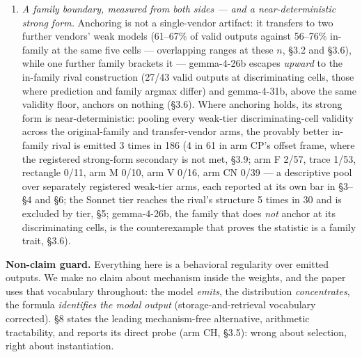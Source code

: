 \begin{enumerate}
{requests as interventions.} Method lines are checkable against emitted coordinates, and 54 of
56 scoreable claims (96.4\%) describe the object actually built (Wilson 95\% interval $[88\%, 99\%]$,
\S6.5). Requesting the line at all is an intervention rather than an observation: the
concentration shift it produced (87\% vs 70\%, $p = 0.0325$ uncorrected) fails multiplicity
correction, is carried by one of three cells and is wave-confounded (\S6.4), so it is reported
as met-as-registered exploratory material, not a demonstrated effect. Studies collecting
process descriptors \emph{by request} are nonetheless measuring a perturbed distribution.
\item \emph{A family boundary, measured from both sides --- and a near-deterministic strong form.}
Anchoring is not a single-vendor artifact: it transfers to two further vendors'
weak models (61--67\% of valid outputs against 56--76\% in-family at the same five cells --- overlapping ranges at these $n$, \S3.2 and \S3.6), while one further family brackets it ---
gemma-4-26b escapes \emph{upward} to the in-family rival construction (27/43 valid outputs at discriminating cells, those where prediction and family argmax differ) and gemma-4-31b, above the same validity floor, anchors on nothing (\S3.6). Where
anchoring holds, its strong form is near-deterministic: pooling every weak-tier discriminating-cell
validity across the original-family and transfer-vendor arms, the provably better in-family
rival is emitted 3 times in 186 (4 in 61 in arm CP's offset frame, where the registered strong-form secondary is not met, \S3.9; arm F 2/57, trace 1/53, rectangle 0/11, arm M 0/10, arm V
0/16, arm CN 0/39 --- a descriptive pool over separately registered weak-tier arms, each reported at its own bar in
\S3--\S4 and \S6; the Sonnet tier reaches the rival's structure 5 times in 30 and is excluded by tier, \S5; gemma-4-26b, the family that does \emph{not} anchor at its discriminating cells, is the
counterexample that proves the statistic is a family trait, \S3.6).
\end{enumerate}

\textbf{Non-claim guard.} Everything here is a behavioral regularity over emitted outputs. We make
no claim about mechanism inside the weights, and the paper uses that vocabulary throughout: the
model \emph{emits}, the distribution \emph{concentrates}, the formula \emph{identifies the modal output}
(storage-and-retrieval vocabulary corrected). \S8 states the leading
mechanism-free alternative, arithmetic tractability, and reports its direct probe (arm CH, \S3.5): wrong about selection, right about instantiation.

